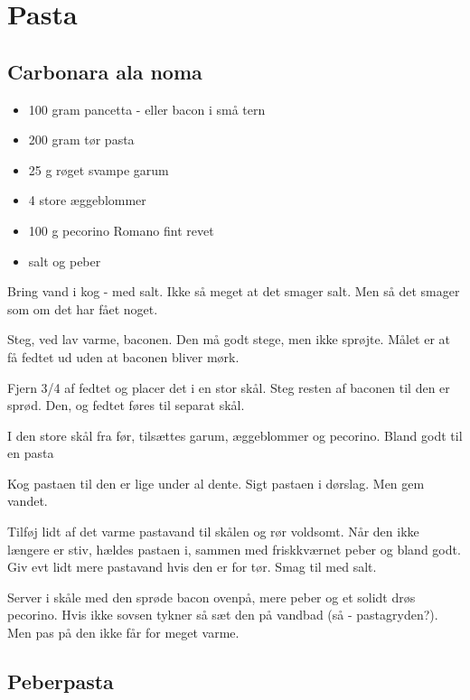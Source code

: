 \documentclass[
  letterpaper,
  DIV=11,
  numbers=noendperiod]{scrreprt}
\providecommand{\tightlist}{%
  \setlength{\itemsep}{0pt}\setlength{\parskip}{0pt}}\usepackage{longtable,booktabs,array}
\begin{document}

\hypertarget{pasta}{%
\chapter{Pasta}\label{pasta}}

\hypertarget{carbonara-ala-noma}{%
\section{Carbonara ala noma}\label{carbonara-ala-noma}}

\begin{itemize}
\tightlist
\item
  100 gram pancetta - eller bacon i små tern
\item
  200 gram tør pasta
\item
  25 g røget svampe garum
\item
  4 store æggeblommer
\item
  100 g pecorino Romano fint revet
\item
  salt og peber
\end{itemize}

Bring vand i kog - med salt. Ikke så meget at det smager salt. Men så
det smager som om det har fået noget.

Steg, ved lav varme, baconen. Den må godt stege, men ikke sprøjte. Målet
er at få fedtet ud uden at baconen bliver mørk.

Fjern 3/4 af fedtet og placer det i en stor skål. Steg resten af baconen
til den er sprød. Den, og fedtet føres til separat skål.

I den store skål fra før, tilsættes garum, æggeblommer og pecorino.
Bland godt til en pasta

Kog pastaen til den er lige under al dente. Sigt pastaen i dørslag. Men
gem vandet.

Tilføj lidt af det varme pastavand til skålen og rør voldsomt. Når den
ikke længere er stiv, hældes pastaen i, sammen med friskkværnet peber og
bland godt. Giv evt lidt mere pastavand hvis den er for tør. Smag til
med salt.

Server i skåle med den sprøde bacon ovenpå, mere peber og et solidt drøs
pecorino. Hvis ikke sovsen tykner så sæt den på vandbad (så -
pastagryden?). Men pas på den ikke får for meget varme.

\hypertarget{peberpasta}{%
\section{Peberpasta}\label{peberpasta}}
\end{document}

